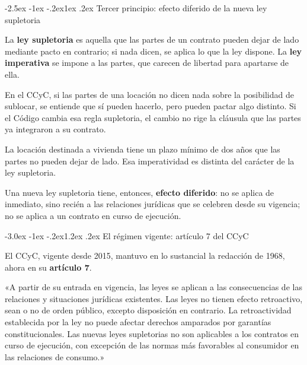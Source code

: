\documentclass[12pt,oneside]{book}
\makeatletter
\renewcommand\section{\@startsection{section}{1}{\z@}%
  {-3.0ex \@plus -1ex \@minus -.2ex}{1.2ex \@plus .2ex}%
  {\normalfont\large\bfseries\color{acento}}}
\renewcommand\subsection{\@startsection{subsection}{2}{\z@}%
  {-2.5ex \@plus -1ex \@minus -.2ex}{1ex \@plus .2ex}%
  {\normalfont\normalsize\bfseries}}
\makeatother
\begin{document}
\subsection{Tercer principio: efecto diferido de la nueva ley supletoria}

\begin{definicion}
La \textbf{ley supletoria} es aquella que las partes de un contrato pueden dejar de lado mediante pacto en contrario; si nada dicen, se aplica lo que la ley dispone. La \textbf{ley imperativa} se impone a las partes, que carecen de libertad para apartarse de ella.
\end{definicion}

\begin{ejemplo}[La sublocación]
En el CCyC, si las partes de una locación no dicen nada sobre la posibilidad de sublocar, se entiende que sí pueden hacerlo, pero pueden pactar algo distinto. Si el Código cambia esa regla supletoria, el cambio no rige la cláusula que las partes ya integraron a su contrato.
\end{ejemplo}

\begin{ejemplo}
La locación destinada a vivienda tiene un plazo mínimo de dos años que las partes no pueden dejar de lado. Esa imperatividad es distinta del carácter de la ley supletoria.
\end{ejemplo}

Una nueva ley supletoria tiene, entonces, \textbf{efecto diferido}: no se aplica de inmediato, sino recién a las relaciones jurídicas que se celebren desde su vigencia; no se aplica a un contrato en curso de ejecución.

\section{El régimen vigente: artículo 7 del CCyC}

El CCyC, vigente desde 2015, mantuvo en lo sustancial la redacción de 1968, ahora en su \textbf{artículo 7}.

\begin{regla}
«A partir de su entrada en vigencia, las leyes se aplican a las consecuencias de las relaciones y situaciones jurídicas existentes. Las leyes no tienen efecto retroactivo, sean o no de orden público, excepto disposición en contrario. La retroactividad establecida por la ley no puede afectar derechos amparados por garantías constitucionales. Las nuevas leyes supletorias no son aplicables a los contratos en curso de ejecución, con excepción de las normas más favorables al consumidor en las relaciones de consumo.»
\end{regla}
\end{document}
